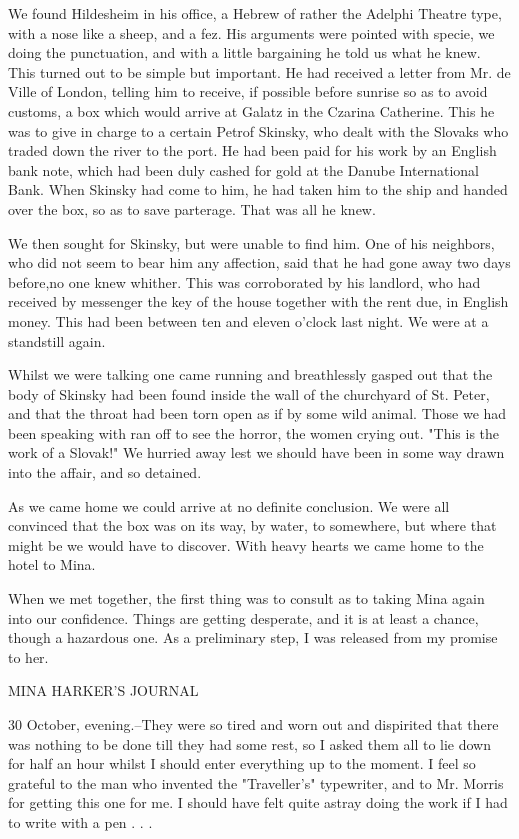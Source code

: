 We found Hildesheim in his office, a Hebrew of rather the Adelphi Theatre type, with a nose like a sheep, and a fez. His arguments were pointed with specie, we doing the punctuation, and with a little bargaining he told us what he knew. This turned out to be simple but important. He had received a letter from Mr. de Ville of London, telling him to receive, if possible before sunrise so as to avoid customs, a box which would arrive at Galatz in the Czarina Catherine. This he was to give in charge to a certain Petrof Skinsky, who dealt with the Slovaks who traded down the river to the port. He had been paid for his work by an English bank note, which had been duly cashed for gold at the Danube International Bank. When Skinsky had come to him, he had taken him to the ship and handed over the box, so as to save parterage. That was all he knew. 

We then sought for Skinsky, but were unable to find him. One of his neighbors, who did not seem to bear him any affection, said that he had gone away two days before,no one knew whither. This was corroborated by his landlord, who had received by messenger the key of the house together with the rent due, in English money. This had been between ten and eleven o'clock last night. We were at a standstill again. 

Whilst we were talking one came running and breathlessly gasped out that the body of Skinsky had been found inside the wall of the churchyard of St. Peter, and that the throat had been torn open as if by some wild animal. Those we had been speaking with ran off to see the horror, the women crying out. "This is the work of a Slovak!" We hurried away lest we should have been in some way drawn into the affair, and so detained. 

As we came home we could arrive at no definite conclusion. We were all convinced that the box was on its way, by water, to somewhere, but where that might be we would have to discover. With heavy hearts we came home to the hotel to Mina. 

When we met together, the first thing was to consult as to taking Mina again into our confidence. Things are getting desperate, and it is at least a chance, though a hazardous one. As a preliminary step, I was released from my promise to her. 

MINA HARKER'S JOURNAL 

30 October, evening.--They were so tired and worn out and dispirited that there was nothing to be done till they had some rest, so I asked them all to lie down for half an hour whilst I should enter everything up to the moment. I feel so grateful to the man who invented the "Traveller's" typewriter, and to Mr. Morris for getting this one for me. I should have felt quite astray doing the work if I had to write with a pen . . . 


